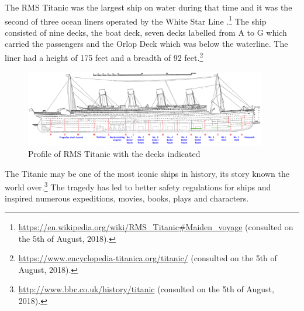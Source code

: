 \documentclass[11pt]{article}
\begin{document}
The RMS Titanic was the largest ship on water during that time and it was the second of three  ocean liners operated by the White Star Line .\footnote{\url{https://en.wikipedia.org/wiki/RMS\_Titanic\#Maiden\_voyage} (consulted on the 5th of August, 2018).} The ship consisted of nine decks, the boat deck, seven decks labelled from A to G which carried the passengers and the Orlop Deck which was below the waterline. The liner had a height of 175 feet and a breadth of 92 feet.\footnote{\url{https://www.encyclopedia-titanica.org/titanic/} (consulted on the 5th of August, 2018).} 

\begin{figure}[htbp]
\centering
\includegraphics[width=400px]{./TitanicProfile.png}
\caption{\label{tab:titanicprofile}
Profile of RMS Titanic with the decks indicated}
\end{figure} 

The Titanic may be one of the most iconic ships in history, its story known the world over.\footnote{\url{http://www.bbc.co.uk/history/titanic} (consulted on the 5th of August, 2018).} The tragedy has led to better safety regulations for ships and inspired numerous expeditions, movies, books, plays and characters.
\end{document}
